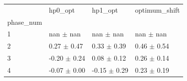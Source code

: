 \begin{tabular}{llll}
\toprule
 & hp0_opt & hp1_opt & optimum_shift \\
phase_num &  &  &  \\
\midrule
1 & nan $\pm$ nan & nan $\pm$ nan & nan $\pm$ nan \\
2 & 0.27 $\pm$ 0.47 & 0.33 $\pm$ 0.39 & 0.46 $\pm$ 0.54 \\
3 & -0.20 $\pm$ 0.24 & 0.08 $\pm$ 0.12 & 0.26 $\pm$ 0.14 \\
4 & -0.07 $\pm$ 0.00 & -0.15 $\pm$ 0.29 & 0.23 $\pm$ 0.19 \\
\bottomrule
\end{tabular}
